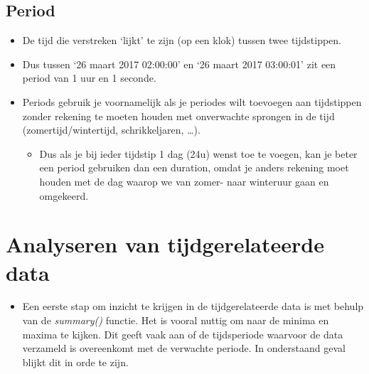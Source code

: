 \documentclass[]{tufte-book}
\providecommand{\tightlist}{%
  \setlength{\itemsep}{0pt}\setlength{\parskip}{0pt}}
\begin{document}
\hypertarget{period}{%
\subsection{Period}\label{period}}

\begin{itemize}
\tightlist
\item
  De tijd die verstreken `lijkt' te zijn (op een klok) tussen twee tijdstippen.
\item
  Dus tussen `26 maart 2017 02:00:00' en `26 maart 2017 03:00:01' zit een period van 1 uur en 1 seconde.
\item
  Periods gebruik je voornamelijk als je periodes wilt toevoegen aan tijdstippen zonder rekening te moeten houden met onverwachte sprongen in de tijd (zomertijd/wintertijd, schrikkeljaren, \ldots).

  \begin{itemize}
  \tightlist
  \item
    Dus als je bij ieder tijdstip 1 dag (24u) wenst toe te voegen, kan je beter een period gebruiken dan een duration, omdat je anders rekening moet houden met de dag waarop we van zomer- naar winteruur gaan en omgekeerd.
  \end{itemize}
\end{itemize}

\hypertarget{analyseren-van-tijdgerelateerde-data}{%
\section{Analyseren van tijdgerelateerde data}\label{analyseren-van-tijdgerelateerde-data}}

\begin{itemize}
\tightlist
\item
  Een eerste stap om inzicht te krijgen in de tijdgerelateerde data is met behulp van de \emph{summary()} functie. Het is vooral nuttig om naar de minima en maxima te kijken. Dit geeft vaak aan of de tijdsperiode waarvoor de data verzameld is overeenkomt met de verwachte periode. In onderstaand geval blijkt dit in orde te zijn.
\end{itemize}
\end{document}
